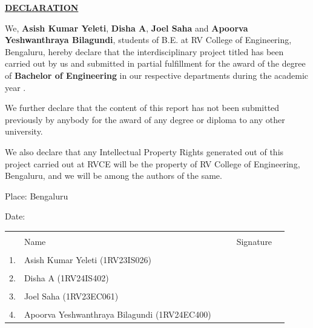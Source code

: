 
\thispagestyle{empty}
\vspace{-0.75cm}
\begin{center}
	\Large\textbf{\underline{DECLARATION}} \par
\end{center}

\noindent We, \textbf{Asish Kumar Yeleti}, \textbf{Disha A}, \textbf{Joel Saha} and \textbf{Apoorva Yeshwanthraya Bilagundi}, students of B.E. at RV College of Engineering, Bengaluru, hereby declare that the interdisciplinary project titled \textbf{\printTitle} has been carried out by us and submitted in partial fulfillment for the award of the degree of \textbf{Bachelor of Engineering} in our respective departments during the academic year \printAcadYear.\\ \par

\noindent We further declare that the content of this report has not been submitted previously by anybody for the award of any degree or diploma to any other university.\\ \par

\noindent We also declare that any Intellectual Property Rights generated out of this project carried out at RVCE will be the property of RV College of Engineering, Bengaluru, and we will be among the authors of the same.

\vspace{1cm}
\noindent Place: Bengaluru\par
\vspace{0.5cm}
\noindent Date: \par
\vspace{1.6cm}

\begin{table}[H]
\centering
\begin{tabular}{llcp{5cm}cc}
	&&&&&\\
	&Name &&& Signature& \\
	&&&&&\\
	1.&Asish Kumar Yeleti (1RV23IS026)&&&&\\
	&&&&&\\
	2.&Disha A (1RV24IS402)&&&&\\
	&&&&&\\
	3.&Joel Saha (1RV23EC061)&&&&\\
	&&&&&\\
	4.&Apoorva Yeshwanthraya Bilagundi (1RV24EC400)&&&&\\
\end{tabular}
\end{table}
